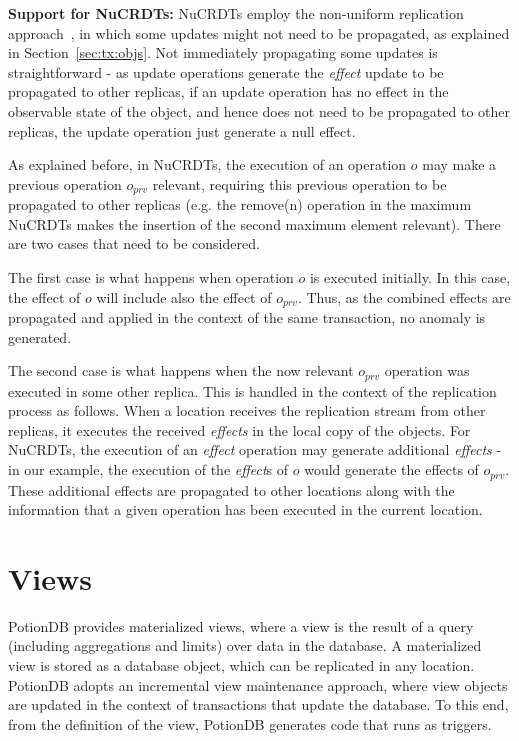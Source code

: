 \documentclass[sigconf, nonacm]{acmart}
\newcommand{\code}[1]{\textsf{\small{#1}}}
\begin{document}
\textbf{Support for NuCRDTs:}
\label{subsec:nonuniform}
NuCRDTs employ the non-uniform replication approach~\cite{Cabrita17Nonuniform}, in which some 
updates might not need to be propagated, as explained in Section~\ref{sec:tx:objs}.
Not immediately propagating some updates is straightforward - as update operations generate 
the \emph{effect} update to be propagated to other replicas, if an update operation has no
effect in the observable state of the object, and hence does not need to be propagated to other replicas, 
the update operation just generate a null effect.

As explained before, in NuCRDTs, the execution of an operation $o$ may make a previous operation  $o_{prv}$
relevant, requiring this previous operation to be propagated to other replicas  
(e.g. the \code{remove(n)} operation in the maximum NuCRDTs makes the insertion of the second
maximum element relevant). There are two cases that need to be considered.

The first case is what happens when operation $o$ is executed initially. In this case, the effect of
$o$ will include also the effect of $o_{prv}$. Thus, as the combined effects are propagated and applied in 
the context of the same transaction, no anomaly is generated.

The second case is what happens when the now relevant $o_{prv}$ operation was executed in some 
other replica.  This is handled in the context of the replication process as follows.  When a location receives
the replication stream from other replicas, it executes the received \emph{effects} in the local copy
of the objects.  For NuCRDTs, the execution of an \emph{effect} operation may generate additional 
\emph{effects} - in our example, the execution of the \emph{effect}s of $o$ would generate
the effects of $o_{prv}$. These additional effects are propagated to other locations along with the 
information that a given operation has been executed in the current location. 

\section{Views}
\label{sec:views_for_apps}

PotionDB provides materialized views, where a view is the result of a query (including aggregations and limits)
over data in the database.  A materialized view is stored as a database object, which can be replicated
in any location.
PotionDB adopts an incremental view maintenance approach, where 
view objects are updated in the context of transactions that update the database. 
To this end, from the definition of the view, PotionDB generates code that runs as triggers.
\end{document}
